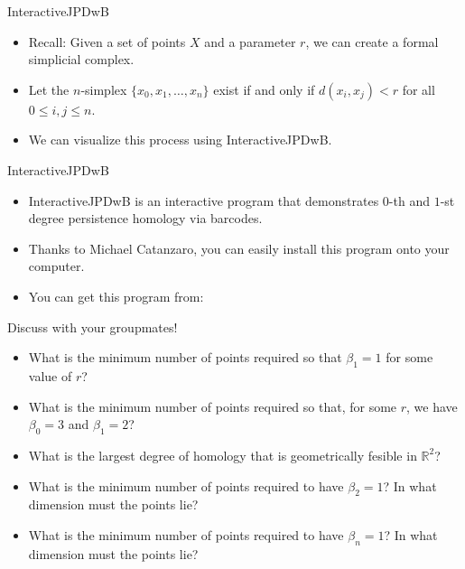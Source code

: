 \begin{frame}{InteractiveJPDwB}
\begin{itemize}
\item<1-> Recall: Given a set of points $X$ and a parameter $r$, we can create a formal simplicial complex.
\item<2-> Let the $n$-simplex $\{x_0, x_1, \ldots, x_n\}$ exist if and only if $d(x_i, x_j) < r$ for all $0 \leq i,j\leq n$. 
\item<3-> We can visualize this process using InteractiveJPDwB.
\end{itemize}
\end{frame}

\begin{frame}{InteractiveJPDwB}
\begin{itemize}
\item<1-> InteractiveJPDwB \cite{Wolcott2016InteractiveJPDwB} is an interactive program that demonstrates $0$-th and $1$-st degree persistence homology via barcodes.
\item<2-> Thanks to Michael Catanzaro, you can easily install this program onto your computer.
\item<3-> You can get this program from:
\end{itemize}
\end{frame}
\begin{frame}{Discuss with your groupmates!}
\begin{itemize}
\item What is the minimum number of points required so that $\beta_1 = 1$ for some value of $r$?
\item What is the minimum number of points required so that, for some $r$, we have $\beta_0 = 3$ and $\beta_1 = 2$?
\item What is the largest degree of homology that is geometrically fesible in $\mathbb{R}^2$?
\item What is the minimum number of points required to have $\beta_2 = 1$? In what dimension must the points lie?
\item What is the minimum number of points required to have $\beta_n = 1$?  In what dimension must the points lie?
\end{itemize}
\end{frame}
